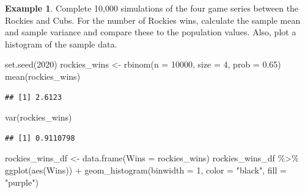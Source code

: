 \documentclass[
  11pt,
]{book}
\newenvironment{Shaded}{\begin{snugshade}}{\end{snugshade}}
\newcommand{\AttributeTok}[1]{\textcolor[rgb]{0.77,0.63,0.00}{#1}}
\newcommand{\DecValTok}[1]{\textcolor[rgb]{0.00,0.00,0.81}{#1}}
\newcommand{\FloatTok}[1]{\textcolor[rgb]{0.00,0.00,0.81}{#1}}
\newcommand{\FunctionTok}[1]{\textcolor[rgb]{0.00,0.00,0.00}{#1}}
\newcommand{\NormalTok}[1]{#1}
\newcommand{\OtherTok}[1]{\textcolor[rgb]{0.56,0.35,0.01}{#1}}
\newcommand{\SpecialCharTok}[1]{\textcolor[rgb]{0.00,0.00,0.00}{#1}}
\newcommand{\StringTok}[1]{\textcolor[rgb]{0.31,0.60,0.02}{#1}}
\theoremstyle{definition}
\theoremstyle{definition}
\newtheorem{example}{Example}[chapter]
\theoremstyle{definition}
\theoremstyle{definition}
\theoremstyle{remark}
\begin{document}
\begin{example}
Complete 10,000 simulations of the four game series between the Rockies and Cubs. For the number of Rockies wins, calculate the sample mean and sample variance and compare these to the population values. Also, plot a histogram of the sample data.
\end{example}

\begin{Shaded}
\begin{Highlighting}[]
\FunctionTok{set.seed}\NormalTok{(}\DecValTok{2020}\NormalTok{)}
\NormalTok{rockies\_wins }\OtherTok{\textless{}{-}} \FunctionTok{rbinom}\NormalTok{(}\AttributeTok{n =} \DecValTok{10000}\NormalTok{, }\AttributeTok{size =} \DecValTok{4}\NormalTok{, }\AttributeTok{prob =} \FloatTok{0.65}\NormalTok{)}
\FunctionTok{mean}\NormalTok{(rockies\_wins)}
\end{Highlighting}
\end{Shaded}

\begin{verbatim}
## [1] 2.6123
\end{verbatim}

\begin{Shaded}
\begin{Highlighting}[]
\FunctionTok{var}\NormalTok{(rockies\_wins)}
\end{Highlighting}
\end{Shaded}

\begin{verbatim}
## [1] 0.9110798
\end{verbatim}

\begin{Shaded}
\begin{Highlighting}[]
\NormalTok{rockies\_wins\_df }\OtherTok{\textless{}{-}} \FunctionTok{data.frame}\NormalTok{(}\AttributeTok{Wins =}\NormalTok{ rockies\_wins)}
\NormalTok{rockies\_wins\_df }\SpecialCharTok{\%\textgreater{}\%}
    \FunctionTok{ggplot}\NormalTok{(}\FunctionTok{aes}\NormalTok{(Wins)) }\SpecialCharTok{+} \FunctionTok{geom\_histogram}\NormalTok{(}\AttributeTok{binwidth =} \DecValTok{1}\NormalTok{, }\AttributeTok{color =} \StringTok{"black"}\NormalTok{, }\AttributeTok{fill =} \StringTok{"purple"}\NormalTok{)}
\end{Highlighting}
\end{Shaded}
\end{document}
